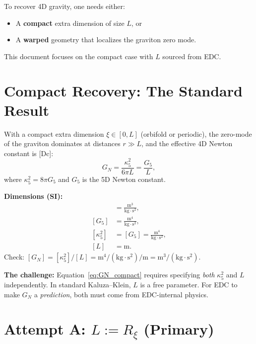 \documentclass[11pt,a4paper]{article}
\newcommand{\tagDc}{\textcolor{purple!70!black}{[Dc]}}
\begin{document}
To recover 4D gravity, one needs either:
\begin{itemize}[nosep]
    \item A \textbf{compact} extra dimension of size $L$, or
    \item A \textbf{warped} geometry that localizes the graviton zero mode.
\end{itemize}
This document focuses on the compact case with $L$ sourced from EDC.

\section{Compact Recovery: The Standard Result}
\label{sec:compact}

With a compact extra dimension $\xi \in [0, L]$ (orbifold or periodic), the zero-mode of the graviton dominates at distances $r \gg L$, and the effective 4D Newton constant is \tagDc{}:
\begin{equation}
    \boxed{G_N = \frac{\kappa_5^2}{6\pi L} = \frac{G_5}{L},}
    \label{eq:GN_compact}
\end{equation}
where $\kappa_5^2 = 8\pi G_5$ and $G_5$ is the 5D Newton constant.

\begin{dimbox}
\textbf{Dimensions (SI):}
\begin{align}
    [G_N] &= \frac{\text{m}^3}{\text{kg} \cdot \text{s}^2}, \\
    [G_5] &= \frac{\text{m}^4}{\text{kg} \cdot \text{s}^2}, \\
    [\kappa_5^2] &= [G_5] = \frac{\text{m}^4}{\text{kg} \cdot \text{s}^2}, \\
    [L] &= \text{m}.
\end{align}
Check: $[G_N] = [\kappa_5^2]/[L] = \text{m}^4/(\text{kg}\cdot\text{s}^2) / \text{m} = \text{m}^3/(\text{kg}\cdot\text{s}^2)$. \checkmark
\end{dimbox}

\textbf{The challenge:} Equation~\eqref{eq:GN_compact} requires specifying \emph{both} $\kappa_5^2$ and $L$ independently.
In standard Kaluza--Klein, $L$ is a free parameter.
For EDC to make $G_N$ a \emph{prediction}, both must come from EDC-internal physics.

\section{Attempt A: $L := R_\xi$ (Primary)}
\label{sec:attempt_A}
\end{document}
